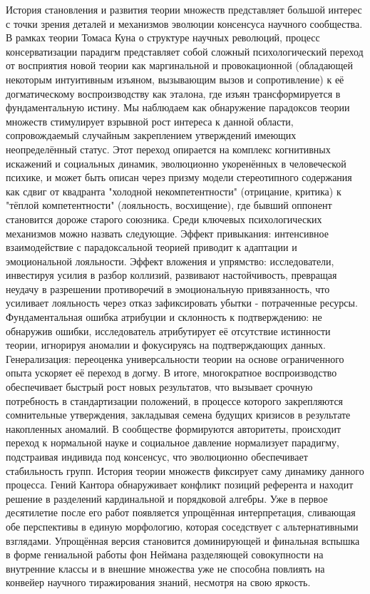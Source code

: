 \documentclass[12pt]{article}
\begin{document}
История становления и развития теории множеств представляет большой интерес с точки зрения деталей и механизмов эволюции консенсуса научного сообщества. В рамках теории Томаса Куна о структуре научных революций, процесс консерватизации парадигм представляет собой сложный психологический переход от восприятия новой теории как маргинальной и провокационной (обладающей некоторым интуитивным изъяном, вызывающим вызов и сопротивление) к её догматическому воспроизводству как эталона, где изъян трансформируется в фундаментальную истину. Мы наблюдаем как обнаружение парадоксов теории множеств стимулирует взрывной рост интереса к данной области, сопровождаемый случайным закреплением утверждений имеющих неопределённый статус. Этот переход опирается на комплекс когнитивных искажений и социальных динамик, эволюционно укоренённых в человеческой психике, и может быть описан через призму модели стереотипного содержания как сдвиг от квадранта "холодной некомпетентности" (отрицание, критика) к "тёплой компетентности" (лояльность, восхищение), где бывший оппонент становится дороже старого союзника. Среди ключевых психологических механизмов можно назвать следующие. Эффект привыкания: интенсивное взаимодействие с парадоксальной теорией приводит к адаптации и эмоциональной лояльности. Эффект вложения и упрямство: исследователи, инвестируя усилия в разбор коллизий, развивают настойчивость, превращая неудачу в разрешении противоречий в эмоциональную привязанность, что усиливает лояльность через отказ зафиксировать убытки - потраченные ресурсы. Фундаментальная ошибка атрибуции и склонность к подтверждению: не обнаружив ошибки, исследователь атрибутирует её отсутствие истинности теории, игнорируя аномалии и фокусируясь на подтверждающих данных. Генерализация: переоценка универсальности теории на основе ограниченного опыта ускоряет её переход в догму. В итоге, многократное воспроизводство обеспечивает быстрый рост новых результатов, что вызывает срочную потребность в стандартизации положений, в процессе которого закрепляются сомнительные утверждения, закладывая семена будущих кризисов в результате накопленных аномалий. В сообществе формируются авторитеты, происходит переход к нормальной науке и социальное давление нормализует парадигму, подстраивая индивида под консенсус, что эволюционно обеспечивает стабильность групп. История теории множеств фиксирует саму динамику данного процесса. Гений Кантора обнаруживает конфликт позиций референта и находит решение в разделений кардинальной и порядковой алгебры. Уже в первое десятилетие после его работ появляется упрощённая интерпретация, сливающая обе перспективы в единую морфологию, которая соседствует с альтернативными взглядами. Упрощённая версия становится доминирующей и финальная вспышка в форме гениальной работы фон Неймана разделяющей совокупности на внутренние классы и в внешние множества уже не способна повлиять на конвейер научного тиражирования знаний, несмотря на свою яркость.
\end{document}
